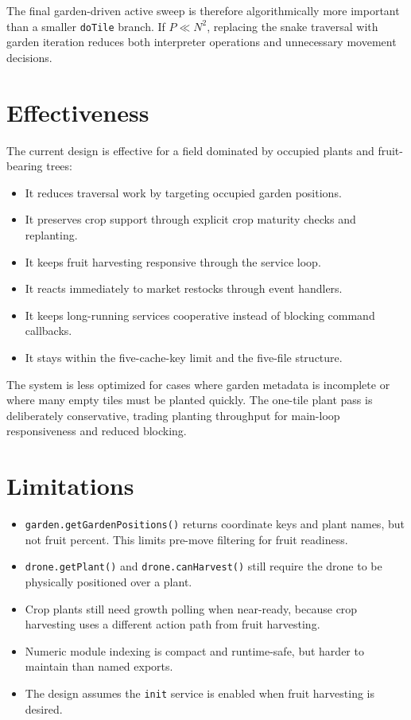 \documentclass[11pt]{article}
\begin{document}
The final garden-driven active sweep is therefore algorithmically more
important than a smaller \texttt{doTile} branch. If \(P \ll N^2\), replacing
the snake traversal with garden iteration reduces both interpreter operations
and unnecessary movement decisions.

\section{Effectiveness}

The current design is effective for a field dominated by occupied plants and
fruit-bearing trees:

\begin{itemize}
    \item It reduces traversal work by targeting occupied garden positions.
    \item It preserves crop support through explicit crop maturity checks and replanting.
    \item It keeps fruit harvesting responsive through the service loop.
    \item It reacts immediately to market restocks through event handlers.
    \item It keeps long-running services cooperative instead of blocking command callbacks.
    \item It stays within the five-cache-key limit and the five-file structure.
\end{itemize}

The system is less optimized for cases where garden metadata is incomplete or
where many empty tiles must be planted quickly. The one-tile plant pass is
deliberately conservative, trading planting throughput for main-loop
responsiveness and reduced blocking.

\section{Limitations}

\begin{itemize}
    \item \texttt{garden.getGardenPositions()} returns coordinate keys and plant names, but not fruit percent. This limits pre-move filtering for fruit readiness.
    \item \texttt{drone.getPlant()} and \texttt{drone.canHarvest()} still require the drone to be physically positioned over a plant.
    \item Crop plants still need growth polling when near-ready, because crop harvesting uses a different action path from fruit harvesting.
    \item Numeric module indexing is compact and runtime-safe, but harder to maintain than named exports.
    \item The design assumes the \texttt{init} service is enabled when fruit harvesting is desired.
\end{itemize}
\end{document}
